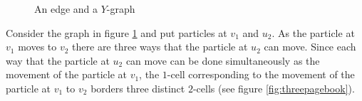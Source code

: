 \begin{figure}
\centering
{}
\caption{An edge and a \(Y\)-graph}
\label{fig:edgeygraph}
\end{figure}
Consider the graph in figure \ref{fig:edgeygraph} and put particles at \(v_1\) and \(u_2\).
As the particle at \(v_1\) moves to \(v_2\) there are three ways that the particle at \(u_2\) can move.
Since each way that the particle at \(u_2\) can move can be done simultaneously as the movement of the particle at \(v_1\),
the \(1\)-cell corresponding to the movement of the particle at \(v_1\) to \(v_2\)
borders three distinct \(2\)-cells (see figure \ref{fig:threepagebook}).
